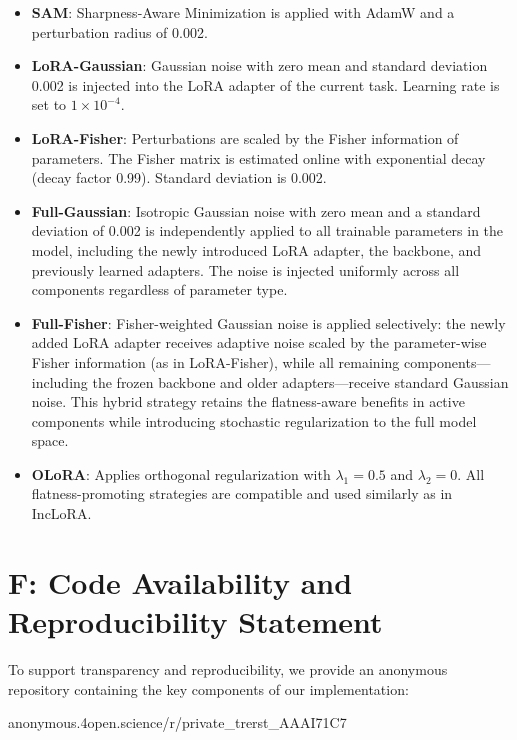 \documentclass[letterpaper]{article} %
\begin{document}
\begin{itemize}
    \item \textbf{SAM}: Sharpness-Aware Minimization is applied with AdamW and a perturbation radius of 0.002.
    \item \textbf{LoRA-Gaussian}: Gaussian noise with zero mean and standard deviation 0.002 is injected into the LoRA adapter of the current task. Learning rate is set to $1\times10^{-4}$.
    \item \textbf{LoRA-Fisher}: Perturbations are scaled by the Fisher information of parameters. The Fisher matrix is estimated online with exponential decay (decay factor 0.99). Standard deviation is 0.002.
    \item \textbf{Full-Gaussian}: Isotropic Gaussian noise with zero mean and a standard deviation of 0.002 is independently applied to all trainable parameters in the model, including the newly introduced LoRA adapter, the backbone, and previously learned adapters. The noise is injected uniformly across all components regardless of parameter type.

    \item \textbf{Full-Fisher}: Fisher-weighted Gaussian noise is applied selectively: the newly added LoRA adapter receives adaptive noise scaled by the parameter-wise Fisher information (as in LoRA-Fisher), while all remaining components—including the frozen backbone and older adapters—receive standard Gaussian noise. This hybrid strategy retains the flatness-aware benefits in active components while introducing stochastic regularization to the full model space.

    \item \textbf{OLoRA}: Applies orthogonal regularization with $\lambda_1 = 0.5$ and $\lambda_2 = 0$. All flatness-promoting strategies are compatible and used similarly as in IncLoRA.
\end{itemize}





\section{F: Code Availability and Reproducibility Statement}

To support transparency and reproducibility, we provide an anonymous repository containing the key components of our implementation:


anonymous.4open.science/r/private\_trerst\_AAAI\-71C7
\end{document}
